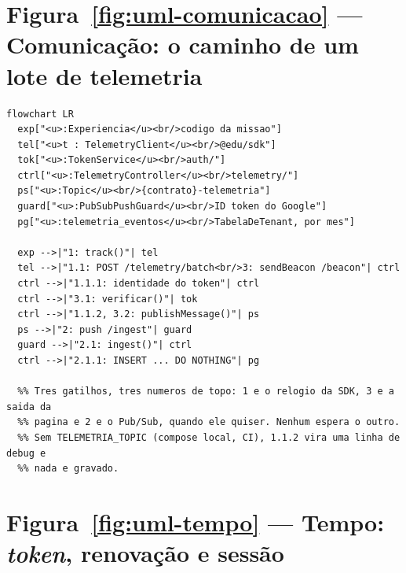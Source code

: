 \section{Figura~\ref{fig:uml-comunicacao} --- Comunicação: o caminho de um lote de telemetria}

\begin{lstlisting}[language=mermaid]
%% aproximacao: o Mermaid nao tem diagrama de comunicacao; cada link vira aresta, a mensagem numerada vira o rotulo dela e a seta da a direcao (o detalhe de cada numero esta na tabela que segue a figura).
flowchart LR
  exp["<u>:Experiencia</u><br/>codigo da missao"]
  tel["<u>t : TelemetryClient</u><br/>@edu/sdk"]
  tok["<u>:TokenService</u><br/>auth/"]
  ctrl["<u>:TelemetryController</u><br/>telemetry/"]
  ps["<u>:Topic</u><br/>{contrato}-telemetria"]
  guard["<u>:PubSubPushGuard</u><br/>ID token do Google"]
  pg["<u>:telemetria_eventos</u><br/>TabelaDeTenant, por mes"]

  exp -->|"1: track()"| tel
  tel -->|"1.1: POST /telemetry/batch<br/>3: sendBeacon /beacon"| ctrl
  ctrl -->|"1.1.1: identidade do token"| ctrl
  ctrl -->|"3.1: verificar()"| tok
  ctrl -->|"1.1.2, 3.2: publishMessage()"| ps
  ps -->|"2: push /ingest"| guard
  guard -->|"2.1: ingest()"| ctrl
  ctrl -->|"2.1.1: INSERT ... DO NOTHING"| pg

  %% Tres gatilhos, tres numeros de topo: 1 e o relogio da SDK, 3 e a saida da
  %% pagina e 2 e o Pub/Sub, quando ele quiser. Nenhum espera o outro.
  %% Sem TELEMETRIA_TOPIC (compose local, CI), 1.1.2 vira uma linha de debug e
  %% nada e gravado.
\end{lstlisting}

\section{Figura~\ref{fig:uml-tempo} --- Tempo: \emph{token}, renovação e sessão}

